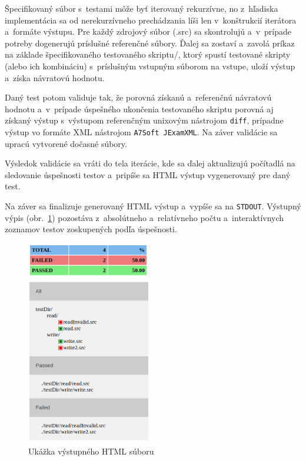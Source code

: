 \documentclass[a4paper, 10pt, twocolumn]{article}
\begin{document}
        Špecifikovaný súbor s~testami môže byť iterovaný rekurzívne, no z~hľadiska implementácia sa od nerekurzívneho prechádzania líši len v~konštrukcií iterátora a~formáte výstupu. Pre každý zdrojový súbor (.src) sa skontrolujú a~v~prípade potreby dogenerujú príslušné referenčné súbory. Ďalej sa zostaví a~zavolá príkaz na základe špecifikovaného testovaného skriptu/, ktorý spustí testované skripty (alebo ich kombináciu) s~príslušným vstupným súborom na vstupe, uloží výstup a~získa návratovú hodnotu.
        
        Daný test potom validuje tak, že porovná získanú a~referenčnú návratovú hodnotu a~v~prípade úspešného ukončenia testovaného skriptu porovná aj získaný výstup s~výstupom referenčným unixovým nástrojom \texttt{diff}, prípadne výstup vo formáte XML nástrojom \texttt{A7Soft JExamXML}. Na záver validácie sa upracú vytvorené dočasné súbory.
    
        Výsledok validácie sa vráti do tela iterácie, kde sa ďalej aktualizujú počítadlá na sledovanie úspešnosti testov a~pripíše sa HTML výstup vygenerovaný pre daný test.
        
        Na záver sa finalizuje generovaný HTML výstup a~vypíše sa na \texttt{STDOUT}. Výstupný výpis (obr.~\ref{fig:output}) pozostáva z~absolútneho a~relatívneho počtu a~interaktívnych zoznamov testov zoskupených podľa úspešnosti.
        
    \begin{figure}
        \centering
        \includegraphics[width=0.48\textwidth]{testExample.png}
        \caption{Ukážka výstupného HTML súboru}
        \label{fig:output}
    \end{figure}
\end{document}
